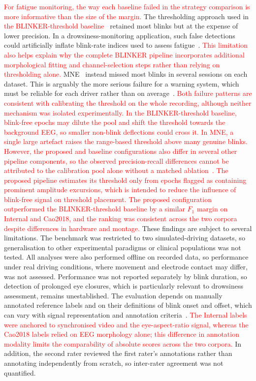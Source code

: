 \documentclass[journal,twoside,web]{ieeecolor}
\newcommand{\rev}[1]{\textcolor{red}{#1}}
\begin{document}
%
%
%
%
%
\rev{For fatigue monitoring, the way each baseline failed in the strategy comparison is more informative than the size of the margin.}
The thresholding approach used in \rev{the BLINKER-threshold baseline}~\citep{kleifges2017blinker} retained most blinks but at the expense of lower precision. In a drowsiness-monitoring application, such false detections could artificially inflate blink-rate indices used to assess fatigue~\citep{tian2021fatigue}. \rev{This limitation also helps explain why the complete BLINKER pipeline incorporates additional morphological fitting and channel-selection steps rather than relying on thresholding alone.}
MNE~\citep{GramfortEtAl2013a} instead missed most blinks in several sessions on each dataset. This is arguably the more serious failure for a warning system, which must be reliable for each driver rather than on average~\citep{ingre2006subjective}.
%
\rev{Both failure patterns are consistent with calibrating the threshold on the whole recording, although neither mechanism was isolated experimentally. In the BLINKER-threshold baseline, blink-free epochs may dilute the pool and shift the threshold towards the background EEG, so smaller non-blink deflections could cross it. In MNE, a single large artefact raises the range-based threshold above many genuine blinks. However, the proposed and baseline configurations also differ in several other pipeline components, so the observed precision-recall differences cannot be attributed to the calibration pool alone without a matched ablation~\citep{schleicher2008blinks}.}
%
\rev{The proposed pipeline estimates its threshold only from epochs flagged as containing prominent amplitude excursions, which is intended to reduce the influence of blink-free signal on threshold placement. The proposed configuration outperformed the BLINKER-threshold baseline by a similar $F_1$ margin on Internal and Cao2018, and the ranking was consistent across the two corpora despite differences in hardware and montage.} 
%
These findings are subject to several limitations. The benchmark was restricted to two simulated-driving datasets, so generalisation to other experimental paradigms or clinical populations was not tested. All analyses were also performed offline on recorded data, so performance under real driving conditions, where movement and electrode contact may differ, was not assessed.
Performance was not reported separately by blink duration, so detection of prolonged eye closures, which is particularly relevant to drowsiness assessment, remains unestablished. The evaluation depends on manually annotated reference labels and on their definitions of blink onset and offset, which can vary with signal representation and annotation criteria~\citep{nystrm2024what}. \rev{The Internal labels were anchored to synchronised video and the eye-aspect-ratio signal, whereas the Cao2018 labels relied on EEG morphology alone; this difference in annotation modality limits the comparability of absolute scores across the two corpora.} In addition, the second rater reviewed the first rater's annotations rather than annotating independently from scratch, so inter-rater agreement was not quantified.
\end{document}
